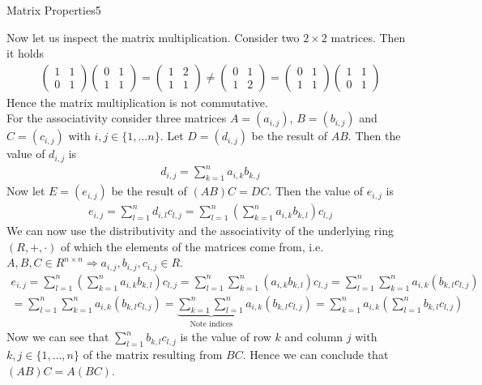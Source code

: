 \begin{questions}
\begin{question}{Matrix Properties}{5}
\begin{answer}
	Now let us inspect the matrix multiplication. Consider two $2 \times 2$ matrices. Then it holds
	\begin{align*}
\begin{pmatrix}
1 & 1\\
0 & 1
\end{pmatrix}\begin{pmatrix}
0 & 1\\
1 & 1
\end{pmatrix} = \begin{pmatrix}
1 & 2\\
1 & 1
\end{pmatrix} \neq \begin{pmatrix}
0 & 1\\
1 & 2
\end{pmatrix} = \begin{pmatrix}
0 & 1\\
1 & 1
\end{pmatrix}\begin{pmatrix}
1 & 1\\
0 & 1
\end{pmatrix}
	\end{align*}
	Hence the matrix multiplication is not commutative.\\
	For the associativity consider three matrices $A = (a_{i, j})$, $B = (b_{i, j})$ and $C = (c_{i, j})$ with $i, j \in \{1, \dots n\}$. Let $D = (d_{i, j})$ be the result of $AB$. Then the value of $d_{i, j}$ is
	\begin{align*}
d_{i, j} = \sum_{k = 1}^n a_{i, k}b_{k, j}
	\end{align*}
	Now let $E = (e_{i, j})$ be the result of $(AB)C = DC$. Then the value of $e_{i, j}$ is
	\begin{align*}
e_{i, j} = \sum_{l = 1}^n d_{i, l}c_{l, j} = \sum_{l = 1}^n (\sum_{k = 1}^n a_{i, k}b_{k, l})c_{l, j}
	\end{align*}
	We can now use the distributivity and the associativity of the underlying ring $(R, +, \cdot)$ of which the elements of the matrices come from, i.e. $A, B, C \in R^{n \times n} \Rightarrow a_{i, j}, b_{i, j}, c_{i, j} \in R$.
	\begin{multline*}
e_{i, j} = \sum_{l = 1}^n (\sum_{k = 1}^n a_{i, k}b_{k, l})c_{l, j} = \sum_{l = 1}^n \sum_{k = 1}^n (a_{i, k}b_{k, l})c_{l, j} = \sum_{l = 1}^n \sum_{k = 1}^n a_{i, k}(b_{k, l}c_{l, j})\\
= \sum_{l = 1}^n \sum_{k = 1}^n a_{i, k}(b_{k, l}c_{l, j}) = \underbrace{\sum_{k = 1}^n \sum_{l = 1}^n}_{\text{Note indices}} a_{i, k}(b_{k, l}c_{l, j}) = \sum_{k = 1}^n  a_{i, k} (\sum_{l = 1}^n b_{k, l}c_{l, j})
	\end{multline*}
	Now we can see that $\sum_{l = 1}^n b_{k, l}c_{l, j}$ is the value of row $k$ and column $j$ with $k, j \in \{1, \dots, n\}$ of the matrix resulting from $BC$. Hence we can conclude that $(AB)C = A(BC)$.



\end{answer}
\end{question}
\end{questions}
